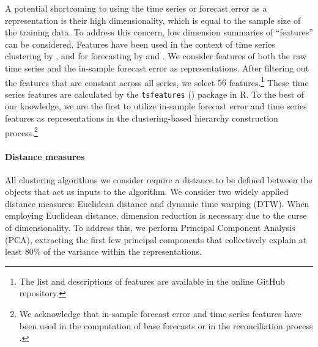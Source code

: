 \documentclass[a4paper,review,12pt,authoryear]{elsarticle}
\let\code=\texttt
\begin{document}
A potential shortcoming to using the time series or forecast error as a representation is their high dimensionality, which is equal to the sample size of the training data. To address this concern, low dimension summaries of ``features'' can be considered. Features have been used in the context {\color{purple} of}
time series clustering by \cite{tianoFeatTSFeaturebasedTime2021}, and for forecasting by \cite{wangUncertaintyEstimationFeaturebased2022} and \cite{ liFeaturebasedIntermittentDemand2023}. 
We consider features of both the raw time series and the in-sample forecast error as representations. After filtering out the features that are constant across all series, we select $56$ features.\footnote{The list and descriptions of features are available in the online GitHub repository.} These time series features are calculated by the \code{tsfeatures} (\citealp{tsfeatures}) package in R. %
{\color{purple}To the best of our knowledge, we are the first to utilize in-sample forecast error and time series features as representations in the clustering-based hierarchy construction process.\footnote{We acknowledge that in-sample forecast error and time series features have been used in the computation of base forecasts or in the reconciliation process \citep[see][]{wickramasuriyaOptimalForecastReconciliation2019}.}}

\paragraph{\textbf{Distance measures}}

All clustering algorithms we consider require a distance to be defined between the objects that act as inputs to the algorithm.
We consider two widely applied distance measures: Euclidean distance and dynamic time warping (DTW). When employing Euclidean distance, dimension reduction is necessary due to the curse of dimensionality. %
To address this, we perform Principal Component Analysis (PCA), extracting the first few principal components that collectively explain at least 80\% of the variance within the representations.
\end{document}
